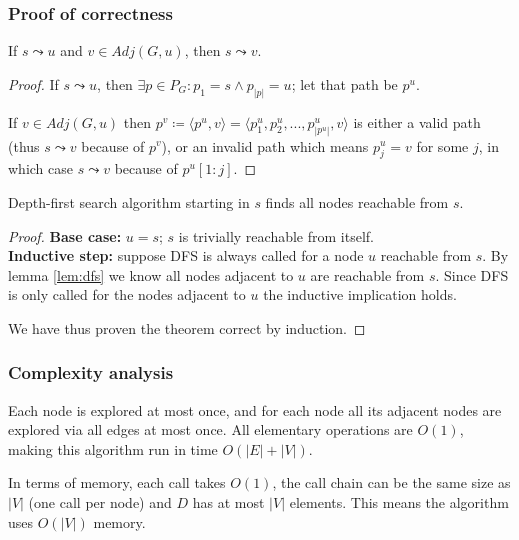 \subsubsection{Proof of correctness}
\begin{lemma} \label{lem:dfs}
    If $s \leadsto u$ and $v \in Adj(G, u)$, then $s \leadsto v$.
\end{lemma}
\begin{proof}
    If $s \leadsto u$, then $\exists p \in P_G \colon p_1 = s \wedge p_{|p|} = u$; let that path be $p^u$.\par
    If $v \in Adj(G, u)$ then $p^v \coloneqq \langle p^u, v \rangle = \langle p^u_1, p^u_2,...,p^u_{|p^u|}, v\rangle$ is either a valid path (thus $s \leadsto v$ because of $p^v$), or an invalid path which means $p^u_j = v$ for some $j$, in which case $s \leadsto v$ because of $p^u[1:j]$.
\end{proof}
\begin{theorem}
    Depth-first search algorithm starting in $s$ finds all nodes reachable from $s$.
\end{theorem}
\begin{proof} \textbf{Base case:} $u=s$; $s$ is trivially reachable from itself. \\
\textbf{Inductive step:} suppose \textsc{DFS} is always called for a node $u$ reachable from $s$. By lemma \ref{lem:dfs} we know all nodes adjacent to $u$ are reachable from $s$. Since \textsc{DFS} is only called for the nodes adjacent to $u$ the inductive implication holds.\par
We have thus proven the theorem correct by induction.
\end{proof}
\subsubsection{Complexity analysis}
Each node is explored at most once, and for each node all its adjacent nodes are explored via all edges at most once. All elementary operations are $O(1)$, making this algorithm run in time $O(|E|+|V|)$.\par
In terms of memory, each call takes $O(1)$, the call chain can be the same size as $|V|$ (one call per node) and $D$ has at most $|V|$ elements. This means the algorithm uses $O(|V|)$ memory.
